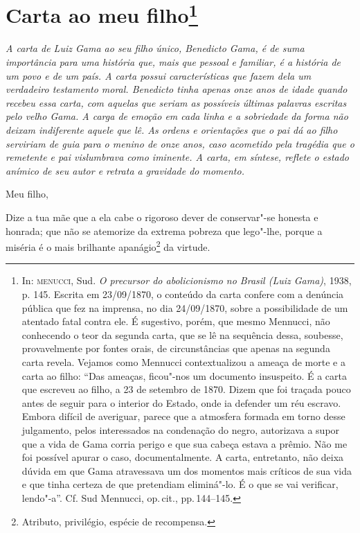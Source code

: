 \chapter{Carta ao meu filho\footnote[*]{
  In: \textsc{menucci}, Sud. \emph{O precursor do abolicionismo no Brasil (Luiz
  Gama)}, 1938, p. 145. Escrita em 23/09/1870, o conteúdo da carta confere com
  a denúncia pública que fez na imprensa, no dia 24/09/1870, sobre a
  possibilidade de um atentado fatal contra ele. É sugestivo, porém, que
  mesmo Mennucci, não conhecendo o teor da segunda carta, que se lê na
  sequência dessa, soubesse, provavelmente por fontes orais, de
  circunstâncias que apenas na segunda carta revela. Vejamos como
  Mennucci contextualizou a ameaça de morte e a carta ao filho: ``Das
  ameaças, ficou"-nos um documento insuspeito. É a carta que escreveu ao
  filho, a 23 de setembro de 1870. Dizem que foi traçada pouco antes de
  seguir para o interior do Estado, onde ia defender um réu escravo.
  Embora difícil de averiguar, parece que a atmosfera formada em torno
  desse julgamento, pelos interessados na condenação do negro,
  autorizava a supor que a vida de Gama corria perigo e que sua cabeça
  estava a prêmio. Não me foi possível apurar o caso, documentalmente. A
  carta, entretanto, não deixa dúvida em que Gama atravessava um dos
  momentos mais críticos de sua vida e que tinha certeza de que
  pretendiam eliminá"-lo. É o que se vai verificar, lendo"-a''. Cf. Sud
  Mennucci, op.\,cit., pp.\,144--145.}}

\begin{flushleft}
{\footnotesize\itshape
A carta de Luiz Gama ao seu filho único, Benedicto Gama, é de suma
importância para uma história que, mais que pessoal e familiar, é a
história de um povo e de um país. A carta possui características que
fazem dela um verdadeiro testamento moral. Benedicto tinha apenas onze
anos de idade quando recebeu essa carta, com aquelas que seriam as
possíveis últimas palavras escritas pelo velho Gama. A carga de emoção
em cada linha e a sobriedade da forma não deixam indiferente aquele que
lê. As ordens e orientações que o
pai dá ao filho serviriam de guia para o
menino de onze anos, caso acometido pela tragédia que o remetente e pai
vislumbrava como iminente. A carta, em síntese, reflete o estado anímico
de seu autor e retrata a gravidade do momento.}
\end{flushleft}

\noindent{}Meu filho,

Dize a tua mãe que a ela cabe o rigoroso dever de conservar"-se honesta e
honrada; que não se atemorize da extrema pobreza que lego"-lhe, porque a
miséria é o mais brilhante apanágio\footnote{Atributo, privilégio,
  espécie de recompensa.} da virtude.

